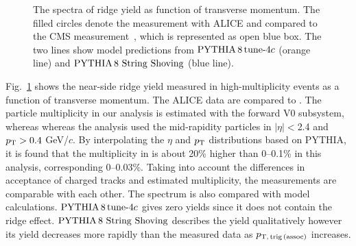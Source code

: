 \begin{figure}[h!]
	\centering
	\caption{ The spectra of ridge yield as function of transverse momentum. The filled circles denote the measurement with ALICE and compared to the CMS measurement~\cite{Khachatryan:2015lva}, which is represented as open blue box. The two lines show model predictions from $\mathrm{PYTHIA}\,8\,\mathrm{tune}{\text -}4c$ (orange line) and ${\mathrm{PYTHIA}\,8~\mathrm{String}~}\mathrm{Shoving}$ (blue line). }
	\label{fig:PlotYSpect}
\end{figure}

Fig.~\ref{fig:PlotYSpect} shows the near-side ridge yield measured in high-multiplicity events as a function of transverse momentum. The ALICE data are compared to \cite{Khachatryan:2015lva}.
The particle multiplicity in our analysis is estimated with the forward V0 subsystem, whereas whereas the analysis \cite{Khachatryan:2015lva}  used the mid-rapidity particles in $|\eta|<$2.4 and $p_\mathrm{T}>0.4$ GeV/$c$. By interpolating the $\eta$ and $p_\mathrm{T}{}$ distributions based on PYTHIA, it is found that the multiplicity in \cite{Khachatryan:2015lva} is about 20\% higher than 0--0.1\% in this analysis, corresponding 0--0.03\%. Taking into account the differences in acceptance of charged tracks and estimated multiplicity, the measurements are comparable with each other. The spectrum is also compared with model calculations. $\mathrm{PYTHIA}\,8\,\mathrm{tune}{\text -}4c$ gives zero yields since it does not contain the ridge effect. ${\mathrm{PYTHIA}\,8~\mathrm{String}~}\mathrm{Shoving}$ describes the yield qualitatively however its yield decreases more rapidly than the measured data as $p_\mathrm{T,\,trig\,(assoc)}$ increases.

